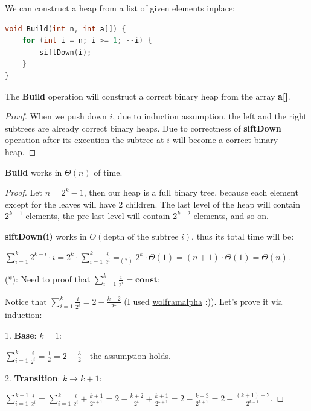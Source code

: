 
We can construct a heap from a list of given elements inplace:

\begin{lstlisting}[language=C++]
void Build(int n, int a[]) {
    for (int i = n; i >= 1; --i) {
        siftDown(i);
    }
}
\end{lstlisting}

\begin{lemma}
    The \textbf{Build} operation will construct a correct binary heap from the array \textbf{a[]}.
\end{lemma}

\begin{proof}
    When we push down $i$, due to induction assumption, the left and the right subtrees are already correct binary heaps. Due to correctness of \textbf{siftDown} operation after its execution the subtree at $i$ will become a correct binary heap.
\end{proof}

\begin{lemma}
    \textbf{Build} works in $\Theta(n)$ of time.
\end{lemma}

\begin{proof}
    Let $n = 2^k-1$, then our heap is a full binary tree, because each element except for the leaves will have 2 children. The last level of the heap will contain $2^{k-1}$ elements, the pre-last level will contain $2^{k-2}$ elements, and so on.

    \textbf{siftDown(i)} works in $O(\text{depth of the subtree $i$})$, thus its total time will be:

    $\sum_{i=1}^{k} 2^{k-i} \cdot i = 2^k \cdot \sum_{i=1}^{k} \frac{i}{2^i} =_{(*)} 2^k \cdot \Theta(1) = (n+1) \cdot \Theta(1) = \Theta(n)$.

    (*): Need to proof that $\sum_{i=1}^{k} \frac{i}{2^i} = \textbf{const}$;

    Notice that $\sum_{i=1}^{k} \frac{i}{2^i} = 2 - \frac{k+2}{2^k}$ (I used \href{https://www.wolframalpha.com/}{wolframalpha} :)). Let's prove it via induction:

    1. \textbf{Base}: $k=1$:

    $\sum_{i=1}^{k} \frac{i}{2^i} = \frac{1}{2} = 2 - \frac{3}{2}$ - the assumption holds.

    2. \textbf{Transition}: $k \to k+1$:

    $\sum_{i=1}^{k+1} \frac{i}{2^i} = \sum_{i=1}^{k} \frac{i}{2^i} + \frac{k+1}{2^{k+1}} = 2 - \frac{k+2}{2^k} + \frac{k+1}{2^{k+1}} = 2 - \frac{k+3}{2^{k+1}} = 2 - \frac{(k+1)+2}{2^{k+1}}$.

\end{proof}

